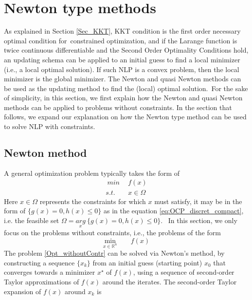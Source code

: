 \documentclass  [
  paper    = a4,
  BCOR     = 10mm,
  twoside,
  fontsize = 12pt,
  fleqn,
  toc      = bibnumbered,
  toc      = listofnumbered,
  numbers  = noendperiod,
  headings = normal,
  listof   = leveldown,
  version  = 3.03
]                                       {scrreprt}
\newcommand{\<}{\langle}
\renewcommand{\>}{\rangle}
\begin{document}
\section{Newton type methods}
As explained in Section \ref{Sec_KKT}, KKT condition is the first order necessary optimal condition for constrained optimization, and if the Larange function is twice continuous differentiable and the Second Order Optimality Conditions hold, an updating schema can be applied to an initial guess to find a local minimizer (i.e., a local optimal solution). If such NLP is a convex problem, then the local minimizer is the global minimizer.
The Newton and quasi Newton methods can be used as the updating method to find the (local) optimal solution. For the sake of simplicity, in this section, we first explain how the Newton and quasi Newton methods can be applied to problems without constraints. In the section that follows, we expand our explanation on how the Newton type method can be used to solve NLP with constraints.

\subsection{Newton method}
\label{Sec:NewtonMethod}
A general optimization problem typically takes the form of 
\begin{equation}
	\begin{aligned}
		\    min &\ \   f(x) \\
		s.t.  & \ \ x \in \Omega
	\end{aligned}
	\label{OptGen}
\end{equation}
Here $x \in \Omega$ represents the constraints for which $x$ must satisfy, it may be in the form of $\{g(x) = 0,  h(x)  \leq  0 \}$ as in the equation \ref{eq:OCP_discret_compact}, i.e. the feasible set $\Omega = \underset{x}{arg} \ \{ g(x) = 0,  h(x)  \leq  0 \}$. 
In this section, we only focus on the problems without constraints, i.e., the problems of the form
\begin{equation}
	\underset{x \in \mathbb{R}^n}{\text{min}} \qquad f(x)
	\label{Opt_withoutContr}
\end{equation}
The problem \ref{Opt_withoutContr} can be solved via Newton's method, by constructing a sequence $\{x_k\}$ from an initial guess (starting point) $x_0$ that converges towards a minimizer $x^\star$ of $f(x)$, using a sequence of second-order Taylor approximations of $f(x)$ around the iterates. The second-order Taylor expansion of $f(x)$ around $x_k$ is
\end{document}
